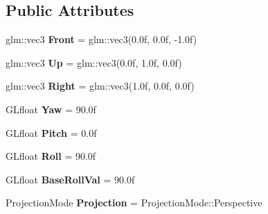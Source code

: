 \subsection*{Public Attributes}
\begin{DoxyCompactItemize}
\item 
\hypertarget{classDCEngine_1_1Components_1_1Camera_acf10f0b7b422b9c069c9ba8cacf0142b}{glm\-::vec3 {\bfseries Front} = glm\-::vec3(0.\-0f, 0.\-0f, -\/1.\-0f)}\label{classDCEngine_1_1Components_1_1Camera_acf10f0b7b422b9c069c9ba8cacf0142b}

\item 
\hypertarget{classDCEngine_1_1Components_1_1Camera_ad4f21f54c25e04d55cdb3c84072c1a96}{glm\-::vec3 {\bfseries Up} = glm\-::vec3(0.\-0f, 1.\-0f, 0.\-0f)}\label{classDCEngine_1_1Components_1_1Camera_ad4f21f54c25e04d55cdb3c84072c1a96}

\item 
\hypertarget{classDCEngine_1_1Components_1_1Camera_a7c2007cccce80e9ab55d575dad8157e6}{glm\-::vec3 {\bfseries Right} = glm\-::vec3(1.\-0f, 0.\-0f, 0.\-0f)}\label{classDCEngine_1_1Components_1_1Camera_a7c2007cccce80e9ab55d575dad8157e6}

\item 
\hypertarget{classDCEngine_1_1Components_1_1Camera_a564d09b431ddf2bbf0baf5312af9dd24}{G\-Lfloat {\bfseries Yaw} = 90.\-0f}\label{classDCEngine_1_1Components_1_1Camera_a564d09b431ddf2bbf0baf5312af9dd24}

\item 
\hypertarget{classDCEngine_1_1Components_1_1Camera_ae2c529610eb6615f0c99db94e20608d5}{G\-Lfloat {\bfseries Pitch} = 0.\-0f}\label{classDCEngine_1_1Components_1_1Camera_ae2c529610eb6615f0c99db94e20608d5}

\item 
\hypertarget{classDCEngine_1_1Components_1_1Camera_a9c0cf62f2fc6f53dcd0285cc63330383}{G\-Lfloat {\bfseries Roll} = 90.\-0f}\label{classDCEngine_1_1Components_1_1Camera_a9c0cf62f2fc6f53dcd0285cc63330383}

\item 
\hypertarget{classDCEngine_1_1Components_1_1Camera_a3a0ee4b6b5fed69e1581a86df8a8ff22}{G\-Lfloat {\bfseries Base\-Roll\-Val} = 90.\-0f}\label{classDCEngine_1_1Components_1_1Camera_a3a0ee4b6b5fed69e1581a86df8a8ff22}

\item 
\hypertarget{classDCEngine_1_1Components_1_1Camera_a80403f32c67b2d3a3bb1a7ab0ba9e97a}{Projection\-Mode {\bfseries Projection} = Projection\-Mode\-::\-Perspective}\label{classDCEngine_1_1Components_1_1Camera_a80403f32c67b2d3a3bb1a7ab0ba9e97a}


\end{DoxyCompactItemize}
